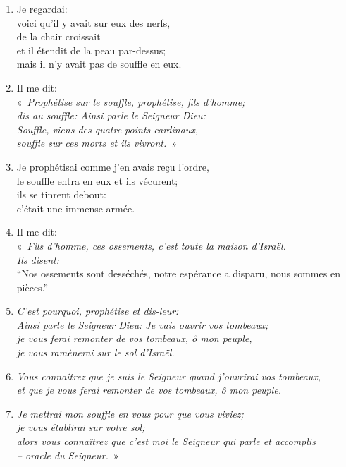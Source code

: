 \begin{enumerate}[leftmargin=\psleftmargin, labelsep = \pslabelsep, label={\arabic*}, font=\color{\pscolor}\small\textsuperscript, parsep=0em, itemsep=0em, topsep=0em ]
    \item Je regardai: \\ voici qu’il y avait sur eux des nerfs, \\ de la chair croissait \\ et il étendit de la peau par-dessus; \\ mais il n’y avait pas de souffle en eux.\verseSpace
    \item Il me dit: \\ \decalage «~\textit{Prophétise sur le souffle, prophétise, fils d’homme; \\ \decalage dis au souffle: Ainsi parle le Seigneur Dieu: \\ \decalage Souffle, viens des quatre points cardinaux, \\ \decalage souffle sur ces morts et ils vivront.}~»
    \item Je prophétisai comme j’en avais reçu l’ordre, \\ le souffle entra en eux et ils vécurent; \\ ils se tinrent debout: \\ c’était une immense armée.\verseSpace
    \item Il me dit: \\ \decalage «~\textit{Fils d’homme, ces ossements, c’est toute la maison d’Israël. \\ \decalage Ils disent:} \\ \decalage \decalage  “Nos ossements sont desséchés, notre espérance a disparu, nous sommes en pièces.”
    \item \decalage \textit{C’est pourquoi, prophétise et dis-leur: \\ \decalage Ainsi parle le Seigneur Dieu: Je vais ouvrir vos tombeaux; \\ \decalage je vous ferai remonter de vos tombeaux, ô mon peuple, \\ \decalage je vous ramènerai sur le sol d’Israël.}
    \item \decalage \textit{Vous connaîtrez que je suis le Seigneur quand j’ouvrirai vos tombeaux, \\ \decalage et que je vous ferai remonter de vos tombeaux, ô mon peuple.}
    \item \decalage \textit{Je mettrai mon souffle en vous pour que vous viviez; \\ \decalage je vous établirai sur votre sol; \\ \decalage alors vous connaîtrez que c’est moi le Seigneur qui parle et accomplis \\ \decalage – oracle du Seigneur.}~»\parSpace

\end{enumerate}
